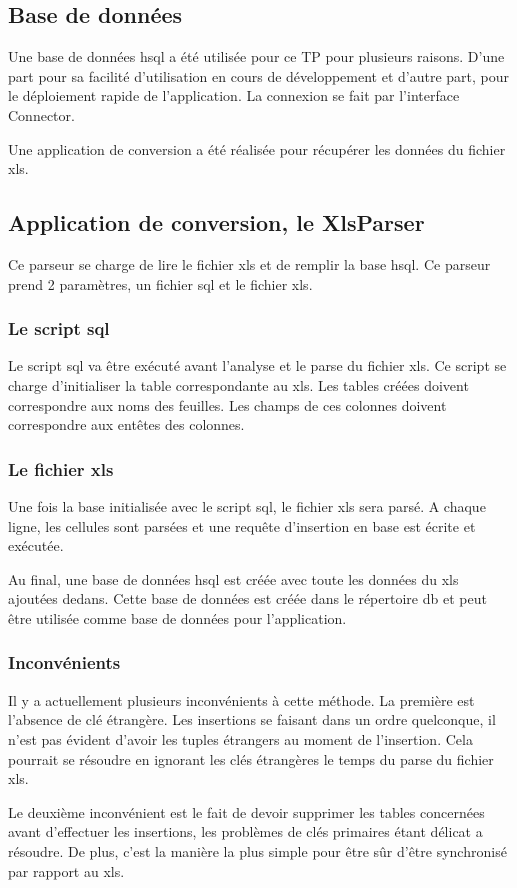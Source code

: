 \subsection{Base de données}
Une base de données hsql a été utilisée pour ce TP pour plusieurs raisons. D'une part pour sa facilité d'utilisation en cours de développement et d'autre part, pour le déploiement rapide de l'application. La connexion se fait par l'interface Connector.

Une application de conversion a été réalisée pour récupérer les données du fichier xls.
\subsection{Application de conversion, le XlsParser}
Ce parseur se charge de lire le fichier xls et de remplir la base hsql. Ce parseur prend 2 paramètres, un fichier sql et le fichier xls.
\subsubsection{Le script sql}
Le script sql va être exécuté avant l'analyse et le parse du fichier xls. Ce script se charge d'initialiser la table correspondante au xls. Les tables créées doivent correspondre aux noms des feuilles. Les champs de ces colonnes doivent correspondre aux entêtes des colonnes.
\subsubsection{Le fichier xls}
Une fois la base initialisée avec le script sql, le fichier xls sera parsé. A chaque ligne, les cellules sont parsées et une requête d'insertion en base est écrite et exécutée.

Au final, une base de données hsql est créée avec toute les données du xls ajoutées dedans. Cette base de données est créée dans le répertoire db et peut être utilisée comme base de données pour l'application.
\subsubsection{Inconvénients}
Il y a actuellement plusieurs inconvénients à cette méthode. La première est l'absence de clé étrangère. Les insertions se faisant dans un ordre quelconque, il n'est pas évident d'avoir les tuples étrangers au moment de l'insertion. Cela pourrait se résoudre en ignorant les clés étrangères le temps du parse du fichier xls.

Le deuxième inconvénient est le fait de devoir supprimer les tables concernées avant d'effectuer les insertions, les problèmes de clés primaires étant délicat a résoudre. De plus, c'est la manière la plus simple pour être sûr d'être synchronisé par rapport au xls.
